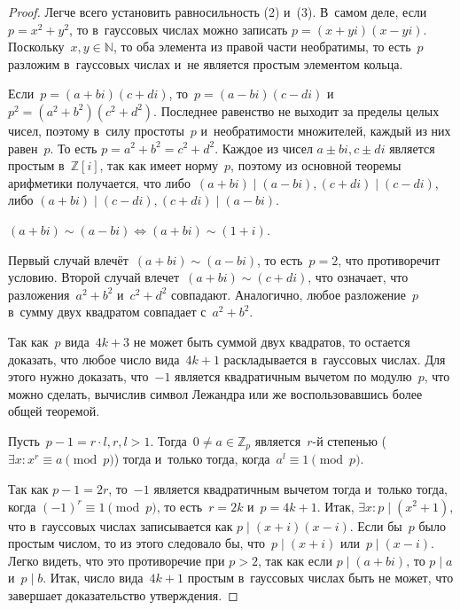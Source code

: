 \documentclass{article}
\begin{document}
\begin{proof}
  Легче всего установить равносильность (2) и~(3). В~самом деле, если $p = x^2 +
  y^2$, то в~гауссовых числах можно записать $p = (x + yi)(x - yi)$.
  Поскольку~$x, y \in \mathbb{N}$, то оба элемента из правой части необратимы,
  то есть~$p$ разложим в~гауссовых числах и~не является простым элементом
  кольца.

  Если~$p = (a + bi)(c + di)$, то~$p = (a - bi)(c - di)$ и~$p^2 = (a^2 +
  b^2)(c^2 + d^2)$. Последнее равенство не выходит за пределы целых чисел,
  поэтому в~силу простоты~$p$ и~необратимости множителей, каждый из них
  равен~$p$. То есть $p = a^2 + b^2 = c^2 + d^2$. Каждое из чисел $a \pm bi, c
  \pm di$ является простым в~$\mathbb{Z}[i]$, так как имеет норму~$p$, поэтому
  из основной теоремы  арифметики получается, что либо~$(a + bi) \mid (a - bi),
  (c + di) \mid (c - di)$, либо $(a + bi) \mid (c - di), (c + di) \mid
  (a - bi)$.
  \begin{exercise}
    $(a + bi) \sim (a - bi) \Leftrightarrow (a + bi) \sim (1 + i)$.
  \end{exercise}
  Первый случай влечёт~$(a + bi) \sim (a - bi)$, то есть~$p = 2$, что
  противоречит условию. Второй случай влечет~$(a + bi) \sim (c + di)$, что
  означает, что разложения~$a^2 + b^2$ и~$c^2 + d^2$ совпадают. Аналогично,
  любое разложение~$p$ в~сумму двух квадратом совпадает с~$a^2 + b^2$.

  Так как~$p$ вида~$4k + 3$ не может быть суммой двух квадратов, то остается
  доказать, что любое число вида~$4k + 1$ раскладывается в~гауссовых числах.
  Для этого нужно доказать, что~$-1$ является квадратичным вычетом по
  модулю~$p$, что можно сделать, вычислив символ Лежандра или же
  воспользовавшись более общей теоремой.

  \begin{theorem}
    Пусть~$p - 1 = r \cdot l, r, l > 1$. Тогда~$0 \ne a \in \mathbb{Z}_p$
    является~$r$-й степенью ($\exists x: x^r \equiv a \pmod p$) тогда и~только
    тогда, когда~$a^l \equiv 1 \pmod p$.
  \end{theorem}

  Так как $p - 1 = 2r$, то~$-1$ является квадратичным вычетом тогда и~только
  тогда, когда $(-1)^r \equiv 1 \pmod p$, то есть~$r = 2k$ и~$p = 4k + 1$.
  Итак, $\exists x: p \mid (x^2 + 1)$, что в~гауссовых числах записывается как
  $p \mid (x + i)(x - i)$. Если бы~$p$ было простым числом, то из этого
  следовало бы, что~$p \mid (x + i)$ или~$p \mid (x - i)$. Легко видеть, что это
  противоречие при $p > 2$, так как если $p \mid (a + bi)$, то $p \mid a$ и~$p
  \mid b$. Итак, число вида~$4k + 1$ простым в~гауссовых числах быть не может,
  что завершает доказательство утверждения.
\end{proof}
\end{document}
